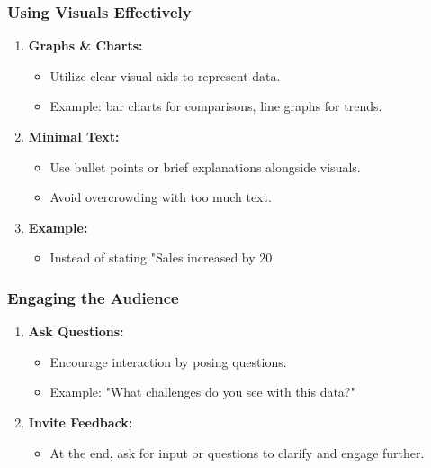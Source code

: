 \documentclass[aspectratio=169]{beamer}
\begin{document}
\begin{frame}[fragile]
    \frametitle{Using Visuals Effectively}
    \begin{enumerate}
        \item \textbf{Graphs \& Charts:}
        \begin{itemize}
            \item Utilize clear visual aids to represent data.
            \item Example: bar charts for comparisons, line graphs for trends.
        \end{itemize}
        
        \item \textbf{Minimal Text:}
        \begin{itemize}
            \item Use bullet points or brief explanations alongside visuals.
            \item Avoid overcrowding with too much text.
        \end{itemize}
        
        \item \textbf{Example:} 
        \begin{itemize}
            \item Instead of stating "Sales increased by 20%
        \end{itemize}
    \end{enumerate}
\end{frame}

\begin{frame}[fragile]
    \frametitle{Engaging the Audience}
    \begin{enumerate}
        \item \textbf{Ask Questions:}
        \begin{itemize}
            \item Encourage interaction by posing questions.
            \item Example: "What challenges do you see with this data?"
        \end{itemize}
        
        \item \textbf{Invite Feedback:}
        \begin{itemize}
            \item At the end, ask for input or questions to clarify and engage further.
        \end{itemize}
    \end{enumerate}
\end{frame}
\end{document}

